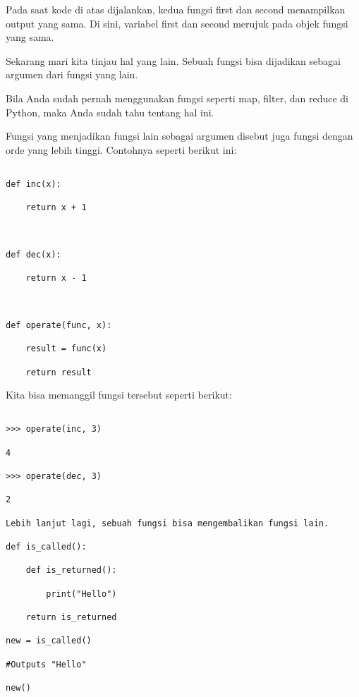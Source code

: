 \documentclass[12pt,a4paper]{article}
\begin{document}
Pada saat kode di atas dijalankan, kedua fungsi first dan second menampilkan output yang sama. Di sini, variabel first dan second merujuk pada objek fungsi yang sama.

Sekarang mari kita tinjau hal yang lain. Sebuah fungsi bisa dijadikan sebagai argumen dari fungsi yang lain.

Bila Anda sudah pernah menggunakan fungsi seperti map, filter, dan reduce di Python, maka Anda sudah tahu tentang hal ini.

Fungsi yang menjadikan fungsi lain sebagai argumen disebut juga fungsi dengan orde yang lebih tinggi. Contohnya seperti berikut ini:



\begin{verbatim}

def inc(x):

    return x + 1

    

def dec(x):

    return x - 1

    

def operate(func, x):

    result = func(x)

    return result

\end{verbatim}





Kita bisa memanggil fungsi tersebut seperti berikut:



\begin{verbatim}

>>> operate(inc, 3)

4

>>> operate(dec, 3)

2

Lebih lanjut lagi, sebuah fungsi bisa mengembalikan fungsi lain.

def is_called():

    def is_returned():

        print("Hello")

    return is_returned

new = is_called()

#Outputs "Hello"

new()

\end{verbatim}
\end{document}

